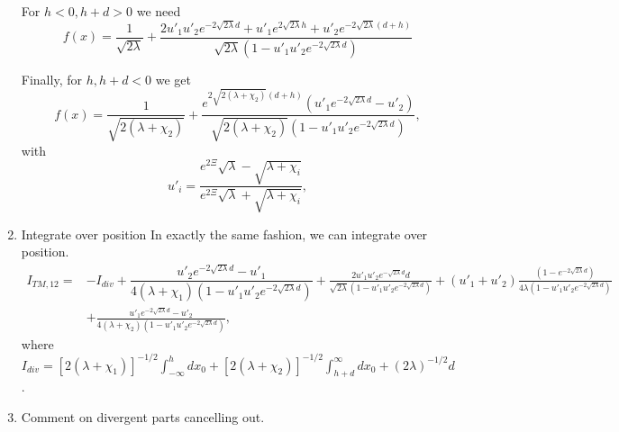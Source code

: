 \begin{enumerate}
    For $h<0, h+d>0$ we need 
    \begin{equation}
      f(x) = \frac{1}{\sqrt{2\lambda}} + \frac{2u'_1u'_2 e^{-2\sqrt{2\lambda}d} + u'_1 e^{2\sqrt{2\lambda}h} +u'_2 e^{-2\sqrt{2\lambda}(d+h)}}{\sqrt{2\lambda}(1-u'_1u'_2 e^{-2\sqrt{2\lambda}d})}
    \end{equation}

    Finally, for $h,h+d<0$ we get 
    \begin{equation}
      f(x) =  \frac{1}{\sqrt{2(\lambda+\chi_2)}} + \frac{e^{2\sqrt{2(\lambda+\chi_2)}(d+h)}(u'_1 e^{-2\sqrt{2\lambda}d} - u'_2)}{\sqrt{2(\lambda+\chi_2)}(1-u'_1u'_2 e^{-2\sqrt{2\lambda}d})},
    \end{equation}
    with 
    \begin{equation}
      u'_i = \frac{e^{2\Xi}\sqrt{\lambda} -\sqrt{\lambda+\chi_i}}{e^{2\Xi}\sqrt{\lambda} + \sqrt{\lambda+\chi_i}},
    \end{equation}
  \item {Integrate over position}
    In exactly the same fashion, we can integrate over position.  
    \begin{align}
      I_{TM,12} =& -I_{div} + \dfrac{u'_2 e^{-2\sqrt{2\lambda}d}-u'_1}{4(\lambda+\chi_1)(1-u'_1u'_2 e^{-2\sqrt{2\lambda}d})} +\frac{2u'_1u'_2 e^{-\sqrt{2\lambda}d}d}{\sqrt{2\lambda}(1-u'_1u'_2 e^{-2\sqrt{2\lambda}d})} + (u'_1+u'_2)\frac{(1-e^{-2\sqrt{2\lambda}d})}{4\lambda(1-u'_1u'_2e^{-2\sqrt{2\lambda}d})}\nonumber\\
      & +\frac{u'_1 e^{-2\sqrt{2\lambda}d} - u'_2}{4(\lambda+\chi_2)(1-u'_1u'_2 e^{-2\sqrt{2\lambda}d})},
    \end{align}
    where $I_{div} = [2(\lambda+\chi_1)]^{-1/2}\int_{-\infty}^h dx_0  +  [2(\lambda+\chi_2)]^{-1/2}\int_{h+d}^\infty dx_0  + (2\lambda)^{-1/2}d$.
  \item Comment on divergent parts cancelling out. 
\end{enumerate}



